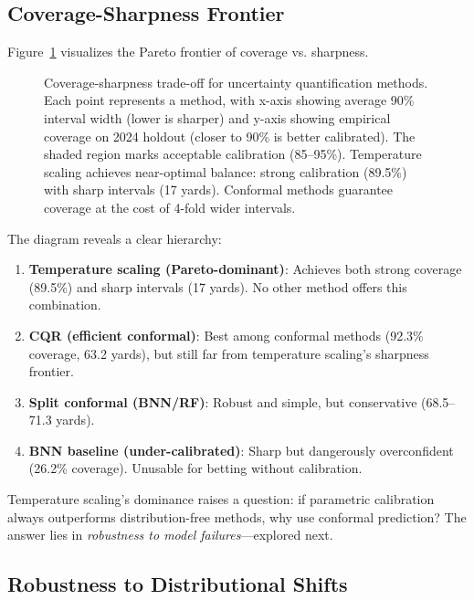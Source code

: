 \subsection{Coverage-Sharpness Frontier}\label{subsec:coverage-sharpness-frontier}

Figure~\ref{fig:conformal-sharpness-tradeoff} visualizes the Pareto frontier of coverage vs. sharpness.

\begin{figure}[t]
    \centering
    
    \caption{Coverage-sharpness trade-off for uncertainty quantification methods. Each point represents a method, with x-axis showing average 90\% interval width (lower is sharper) and y-axis showing empirical coverage on 2024 holdout (closer to 90\% is better calibrated). The shaded region marks acceptable calibration (85--95\%). Temperature scaling achieves near-optimal balance: strong calibration (89.5\%) with sharp intervals (17 yards). Conformal methods guarantee coverage at the cost of 4-fold wider intervals.}
    \label{fig:conformal-sharpness-tradeoff}
\end{figure}

The diagram reveals a clear hierarchy:

\begin{enumerate}
    \item \textbf{Temperature scaling (Pareto-dominant)}: Achieves both strong coverage (89.5\%) and sharp intervals (17 yards). No other method offers this combination.

    \item \textbf{CQR (efficient conformal)}: Best among conformal methods (92.3\% coverage, 63.2 yards), but still far from temperature scaling's sharpness frontier.

    \item \textbf{Split conformal (BNN/RF)}: Robust and simple, but conservative (68.5--71.3 yards).

    \item \textbf{BNN baseline (under-calibrated)}: Sharp but dangerously overconfident (26.2\% coverage). Unusable for betting without calibration.
\end{enumerate}

Temperature scaling's dominance raises a question: if parametric calibration always outperforms distribution-free methods, why use conformal prediction? The answer lies in \textit{robustness to model failures}—explored next.

\subsection{Robustness to Distributional Shifts}\label{subsec:conformal-robustness}

